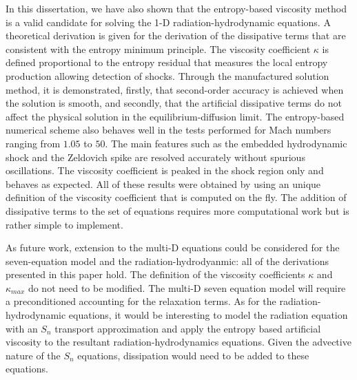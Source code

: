 In this dissertation, we have also shown that the entropy-based viscosity method is a valid candidate for solving the 1-D radiation-hydrodynamic equations. A theoretical derivation is given for the derivation of the dissipative terms that are consistent with the entropy minimum principle. The viscosity coefficient $\kappa$ is defined proportional to the entropy residual that measures the local entropy production allowing detection of shocks. Through the manufactured solution method, it is demonstrated, firstly, that second-order accuracy is achieved when the solution is smooth, and secondly, that the artificial dissipative terms do not affect the physical solution in the equilibrium-diffusion limit. 
The entropy-based numerical scheme also behaves well in the tests performed for Mach numbers ranging from $1.05$ to $50$. The main features such as the embedded hydrodynamic shock and the Zeldovich spike are resolved accurately without spurious oscillations. The viscosity coefficient is peaked in the shock region only and behaves as expected. All of these results were obtained by using an unique definition of the viscosity coefficient that is computed on the fly. The addition of dissipative terms to the set of equations requires more computational work but is rather simple to implement.

As future work, extension to the multi-D equations could be considered for the seven-equation model and the radiation-hydrodyanmic: all of the derivations presented in this paper hold. The definition of the viscosity coefficients $\kappa$ and $\kappa_{max}$ do not need to be modified. The multi-D seven equation model will require a preconditioned accounting for the relaxation terms. As for the radiation-hydrodynamic equations, it would be interesting to model the radiation equation with an $S_n$ transport approximation and apply the entropy based artificial viscosity to the resultant radiation-hydrodynamics equations. Given the advective nature of the $S_n$ equations, dissipation would need to be added to these equations.